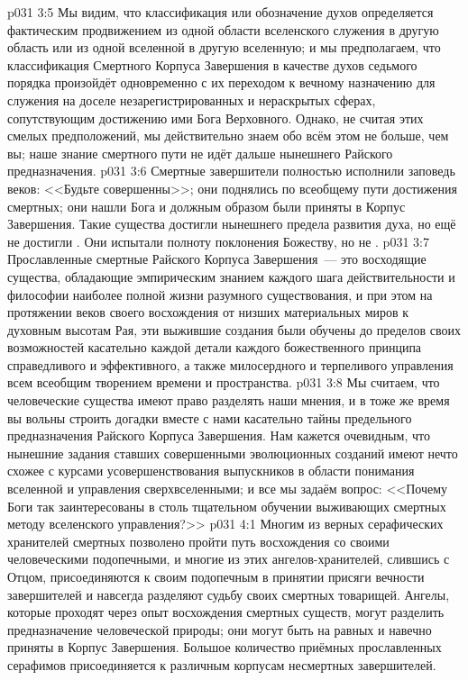 \vs p031 3:5 Мы видим, что классификация или обозначение духов определяется фактическим продвижением из одной области вселенского служения в другую область или из одной вселенной в другую вселенную; и мы предполагаем, что классификация Смертного Корпуса Завершения в качестве духов седьмого порядка произойдёт одновременно с их переходом к вечному назначению для служения на доселе незарегистрированных и нераскрытых сферах, сопутствующим достижению ими Бога Верховного. Однако, не считая этих смелых предположений, мы действительно знаем обо всём этом не больше, чем вы; наше знание смертного пути не идёт дальше нынешнего Райского предназначения.
\vs p031 3:6 Смертные завершители полностью исполнили заповедь веков: <<Будьте совершенны>>; они поднялись по всеобщему пути достижения смертных; они нашли Бога и должным образом были приняты в Корпус Завершения. Такие существа достигли нынешнего предела развития духа, но ещё не достигли . Они испытали полноту поклонения Божеству, но не .
\vs p031 3:7 Прославленные смертные Райского Корпуса Завершения~--- это восходящие существа, обладающие эмпирическим знанием каждого шага действительности и философии наиболее полной жизни разумного существования, и при этом на протяжении веков своего восхождения от низших материальных миров к духовным высотам Рая, эти выжившие создания были обучены до пределов своих возможностей касательно каждой детали каждого божественного принципа справедливого и эффективного, а также милосердного и терпеливого управления всем всеобщим творением времени и пространства.
\vs p031 3:8 \pc Мы считаем, что человеческие существа имеют право разделять наши мнения, и в тоже же время вы вольны строить догадки вместе с нами касательно тайны предельного предназначения Райского Корпуса Завершения. Нам кажется очевидным, что нынешние задания ставших совершенными эволюционных созданий имеют нечто схожее с курсами усовершенствования выпускников в области понимания вселенной и управления сверхвселенными; и все мы задаём вопрос: <<Почему Боги так заинтересованы в столь тщательном обучении выживающих смертных методу вселенского управления?>>
\vs p031 4:1 Многим из верных серафических хранителей смертных позволено пройти путь восхождения со своими человеческими подопечными, и многие из этих ангелов\hyp{}хранителей, слившись с Отцом, присоединяются к своим подопечным в принятии присяги вечности завершителей и навсегда разделяют судьбу своих смертных товарищей. Ангелы, которые проходят через опыт восхождения смертных существ, могут разделить предназначение человеческой природы; они могут быть на равных и навечно приняты в Корпус Завершения. Большое количество приёмных прославленных серафимов присоединяется к различным корпусам несмертных завершителей.
